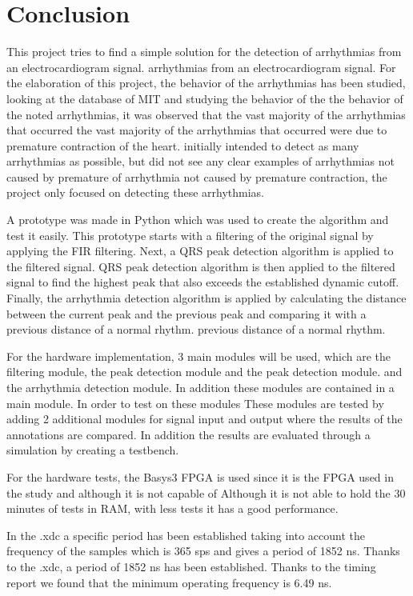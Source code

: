 \chapter*{Conclusion}

This project tries to find a simple solution for the detection of arrhythmias from an electrocardiogram signal. 
arrhythmias from an electrocardiogram signal. For the elaboration of this project, 
the behavior of the arrhythmias has been studied, looking at the database of MIT and studying the behavior of the
the behavior of the noted arrhythmias, it was observed that the vast majority of the arrhythmias that occurred 
the vast majority of the arrhythmias that occurred were due to premature contraction of the heart.
initially intended to detect as many arrhythmias as possible, but did not see any clear examples of arrhythmias not caused by premature
of arrhythmia not caused by premature contraction, the project only focused on detecting these arrhythmias.

A prototype was made in Python which was used to create the algorithm and test it easily. This prototype starts
with a filtering of the original signal by applying the FIR filtering. Next, a QRS peak detection algorithm is applied to the filtered signal. 
QRS peak detection algorithm is then applied to the filtered signal to find the highest peak that also exceeds the established dynamic cutoff.
Finally, the arrhythmia detection algorithm is applied by calculating the distance between the current peak and the previous peak and comparing it with a previous distance of a normal rhythm.
previous distance of a normal rhythm.

For the hardware implementation, 3 main modules will be used, which are the filtering module, the peak detection module and the peak detection module. 
and the arrhythmia detection module. In addition these modules are contained in a main module. In order to test on these modules
These modules are tested by adding 2 additional modules for signal input and output where the results of the annotations are compared. In addition 
the results are evaluated through a simulation by creating a testbench.

For the hardware tests, the Basys3 FPGA is used since it is the FPGA used in the study and although it is not capable of 
Although it is not able to hold the 30 minutes of tests in RAM, with less tests it has a good performance.

In the .xdc a specific period has been established taking into account the frequency of the samples which is 365 sps and gives a period of 1852 ns. Thanks to the .xdc, a period of 1852 ns has been established. 
Thanks to the timing report we found that the minimum operating frequency is 6.49 ns.

